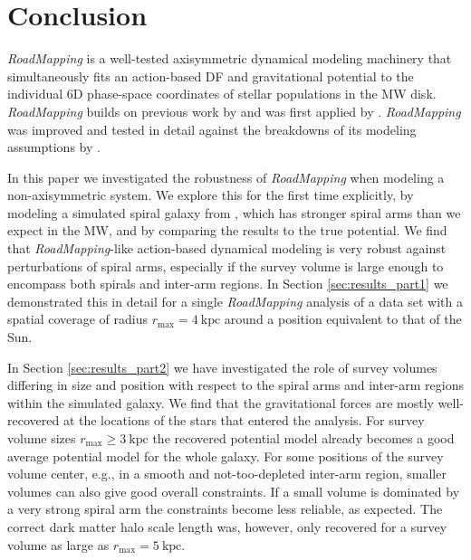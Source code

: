 \documentclass[iop,revtex4,numberedappendix,appendixfloats]{emulateapj}
\newcommand{\RM}{{\sl RoadMapping}}
\begin{document}
\section{Conclusion} \label{sec:conclusion}

\RM{} is a well-tested axisymmetric dynamical modeling machinery that simultaneously fits an action-based DF and gravitational potential to the individual 6D phase-space coordinates of stellar populations in the MW disk. \RM{} builds on previous work by \citet{2011MNRAS.413.1889B,2012MNRAS.426.1324B,2015ApJS..216...29B} and was first applied by \citet{2013ApJ...779..115B}. \RM{} was improved and tested in detail against the breakdowns of its modeling assumptions by \citet{2016ApJ...830...97T}. 

In this paper we investigated the robustness of \RM{} when modeling a non-axisymmetric system. We explore this for the first time explicitly, by modeling a simulated spiral galaxy from \citet{2013ApJ...766...34D}, which has stronger spiral arms than we expect in the MW, and by comparing the results to the true potential. We find that \RM{}-like action-based dynamical modeling is very robust against perturbations of spiral arms, especially if the survey volume is large enough to encompass both spirals and inter-arm regions. In Section \ref{sec:results_part1} we demonstrated this in detail for a single \RM{} analysis of a data set with a spatial coverage of radius $r_\text{max}=4~\text{kpc}$ around a position equivalent to that of the Sun.

In Section \ref{sec:results_part2} we have investigated the role of survey volumes differing in size and position with respect to the spiral arms and inter-arm regions within the simulated galaxy. We find that the gravitational forces are mostly well-recovered at the locations of the stars that entered the analysis. For survey volume sizes $r_\text{max} \geq 3~\text{kpc}$ the recovered potential model already becomes a good average potential model for the whole galaxy. For some positions of the survey volume center, e.g., in a smooth and not-too-depleted inter-arm region, smaller volumes can also give good overall constraints. If a small volume is dominated by a very strong spiral arm the constraints become less reliable, as expected. The correct dark matter halo scale length was, however, only recovered for a survey volume as large as $r_\text{max}=5~\text{kpc}$. 
\end{document}
